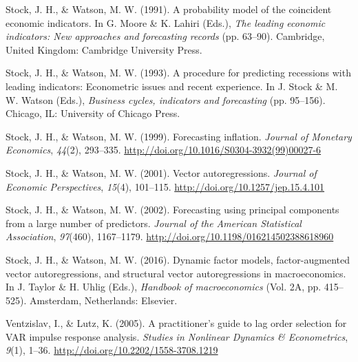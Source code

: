 \documentclass[12pt,twoside]{reedthesis}
\begin{document}
\leavevmode\hypertarget{ref-stocwats:1991}{}%
Stock, J. H., \& Watson, M. W. (1991). A probability model of the coincident economic indicators. In G. Moore \& K. Lahiri (Eds.), \emph{The leading economic indicators: New approaches and forecasting records} (pp. 63--90). Cambridge, United Kingdom: Cambridge University Press.

\leavevmode\hypertarget{ref-stocwats:1993}{}%
Stock, J. H., \& Watson, M. W. (1993). A procedure for predicting recessions with leading indicators: Econometric issues and recent experience. In J. Stock \& M. W. Watson (Eds.), \emph{Business cycles, indicators and forecasting} (pp. 95--156). Chicago, IL: University of Chicago Press.

\leavevmode\hypertarget{ref-stocwats:1999}{}%
Stock, J. H., \& Watson, M. W. (1999). Forecasting inflation. \emph{Journal of Monetary Economics}, \emph{44}(2), 293--335. \url{http://doi.org/10.1016/S0304-3932(99)00027-6}

\leavevmode\hypertarget{ref-stocwats:2001}{}%
Stock, J. H., \& Watson, M. W. (2001). Vector autoregressions. \emph{Journal of Economic Perspectives}, \emph{15}(4), 101--115. \url{http://doi.org/10.1257/jep.15.4.101}

\leavevmode\hypertarget{ref-stocwats:2002}{}%
Stock, J. H., \& Watson, M. W. (2002). Forecasting using principal components from a large number of predictors. \emph{Journal of the American Statistical Association}, \emph{97}(460), 1167--1179. \url{http://doi.org/10.1198/016214502388618960}

\leavevmode\hypertarget{ref-stocwats:2016}{}%
Stock, J. H., \& Watson, M. W. (2016). Dynamic factor models, factor-augmented vector autoregressions, and structural vector autoregressions in macroeconomics. In J. Taylor \& H. Uhlig (Eds.), \emph{Handbook of macroeconomics} (Vol. 2A, pp. 415--525). Amsterdam, Netherlands: Elsevier.

\leavevmode\hypertarget{ref-ventlutz:2005}{}%
Ventzislav, I., \& Lutz, K. (2005). A practitioner's guide to lag order selection for VAR impulse response analysis. \emph{Studies in Nonlinear Dynamics \& Econometrics}, \emph{9}(1), 1--36. \url{http://doi.org/10.2202/1558-3708.1219}


\end{document}
